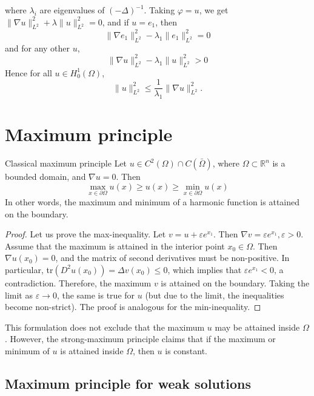 \documentclass{report}
\begin{document}
\begin{enumerate}
    where \(\lambda_{i}\) are eigenvalues of \((-\Delta)^{-1}\). Taking \(\varphi = u\), we get \(\|\nabla u\|_{L^{2}}^{2} + \lambda\|u\|_{L^{2}}^{2} = 0\), and if \(u = e_{1}\), then 
    \[
        \|\nabla e_{1}\|_{L^{2}}^{2} - \lambda_{1}\|e_{1}\|_{L^{2}}^{2} = 0 
    \]
    and for any other \(u\),
    \[
        \|\nabla u\|_{L^{2}}^{2} - \lambda_{1}\|u\|_{L^{2}}^{2} > 0 
    \] 
    Hence for all \(u \in H^{1}_{0}(\Omega)\),
    \[
        \|u\|_{L^{2}}^{2} \leq \frac{1}{\lambda_{1}} \|\nabla u\|_{L^{2}}^{2}.
    \] 
\end{enumerate}

\section{Maximum principle}
\begin{theorem}{Classical maximum principle}{}
    Let \(u \in C^{2}(\Omega) \cap C(\bar{\Omega})\), where \(\Omega \subset \mathbb{R}^{n}\) is a bounded domain, and \(\nabla u = 0\). Then
    \[
        \max\limits_{x \in \partial \Omega} u(x) \geq u(x) \geq \min\limits_{x \in \partial \Omega} u(x)
    \]
    In other words, the maximum and minimum of a harmonic function is attained on the boundary.
\end{theorem}

\begin{proof}
    Let us prove the max-inequality. Let \(v = u + \varepsilon e^{x_{1}}\). Then \(\nabla v = \varepsilon e^{x_{1}}, \varepsilon > 0\). Assume that the maximum is attained in the interior point \(x_{0} \in \Omega\). Then \(\nabla u(x_{0}) = 0\), and the matrix of second derivatives must be non-positive. In particular, tr\((D^{2}u(x_{0})) = \Delta v(x_{0}) \leq 0\), which implies that \(\varepsilon e^{x_{1}} < 0\), a contradiction. Therefore, the maximum \(v\) is attained on the boundary. Taking the limit as \(\varepsilon \to 0\), the same is true for \(u\) (but due to the limit, the inequalities become non-strict). The proof is analogous for the min-inequality.
\end{proof}
This formulation does not exclude that the maximum \(u\) may be attained inside \(\Omega\). However, the strong-maximum principle claims that if the maximum or minimum of \(u\) is attained inside \(\Omega\), then \(u\) is constant.

\subsection*{Maximum principle for weak solutions}
\end{document}
